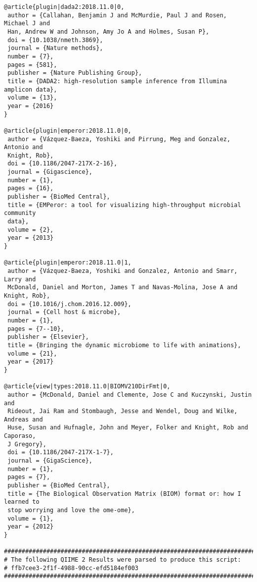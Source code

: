 \begin{footnotesize}
\begin{verbatim}
@article{plugin|dada2:2018.11.0|0,
 author = {Callahan, Benjamin J and McMurdie, Paul J and Rosen, Michael J and
 Han, Andrew W and Johnson, Amy Jo A and Holmes, Susan P},
 doi = {10.1038/nmeth.3869},
 journal = {Nature methods},
 number = {7},
 pages = {581},
 publisher = {Nature Publishing Group},
 title = {DADA2: high-resolution sample inference from Illumina amplicon data},
 volume = {13},
 year = {2016}
}

@article{plugin|emperor:2018.11.0|0,
 author = {Vázquez-Baeza, Yoshiki and Pirrung, Meg and Gonzalez, Antonio and
 Knight, Rob},
 doi = {10.1186/2047-217X-2-16},
 journal = {Gigascience},
 number = {1},
 pages = {16},
 publisher = {BioMed Central},
 title = {EMPeror: a tool for visualizing high-throughput microbial community
 data},
 volume = {2},
 year = {2013}
}

@article{plugin|emperor:2018.11.0|1,
 author = {Vázquez-Baeza, Yoshiki and Gonzalez, Antonio and Smarr, Larry and
 McDonald, Daniel and Morton, James T and Navas-Molina, Jose A and Knight, Rob},
 doi = {10.1016/j.chom.2016.12.009},
 journal = {Cell host & microbe},
 number = {1},
 pages = {7--10},
 publisher = {Elsevier},
 title = {Bringing the dynamic microbiome to life with animations},
 volume = {21},
 year = {2017}
}

@article{view|types:2018.11.0|BIOMV210DirFmt|0,
 author = {McDonald, Daniel and Clemente, Jose C and Kuczynski, Justin and
 Rideout, Jai Ram and Stombaugh, Jesse and Wendel, Doug and Wilke, Andreas and
 Huse, Susan and Hufnagle, John and Meyer, Folker and Knight, Rob and Caporaso,
 J Gregory},
 doi = {10.1186/2047-217X-1-7},
 journal = {GigaScience},
 number = {1},
 pages = {7},
 publisher = {BioMed Central},
 title = {The Biological Observation Matrix (BIOM) format or: how I learned to
 stop worrying and love the ome-ome},
 volume = {1},
 year = {2012}
}

###############################################################################
# The following QIIME 2 Results were parsed to produce this script:
# ffb7cee3-2f1f-4988-90cc-efd5184ef003
###############################################################################
\end{verbatim}
\end{footnotesize}